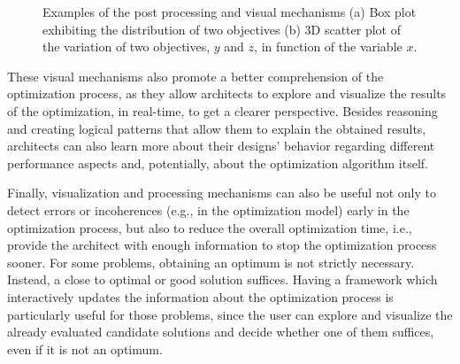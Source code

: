 \begin{figure}[htbp]
	\centering
	\hfill
	
	\caption[Examples of the post processing and visual mechanisms of the proposed solution]{Examples of the post processing and visual mechanisms (a) Box plot exhibiting the distribution of two objectives (b) 3D scatter plot of the variation of two objectives, $y$ and $z$, in function of the variable $x$.}
	\label{fig:postprocessing}
\end{figure}

These visual mechanisms also promote a better comprehension of the optimization process, as they allow architects to explore and visualize the results of the optimization, in real-time, to get a clearer perspective. Besides reasoning and creating logical patterns that allow them to explain the obtained results, architects can also learn more about their designs' behavior regarding different performance aspects and, potentially, about the optimization algorithm itself.

Finally, visualization and processing mechanisms can also be useful not only to detect errors or incoherences (e.g., in the optimization model) early in the optimization process, but also to reduce the overall optimization time, i.e.,  provide the architect with enough information to stop the optimization process sooner. For some problems, obtaining an optimum is not strictly necessary. Instead, a close to optimal or good solution suffices. Having a framework which interactively updates the information about the optimization process is particularly useful for those problems, since the user can explore and visualize the already evaluated candidate solutions and decide whether one of them suffices, even if it is not an optimum. 

